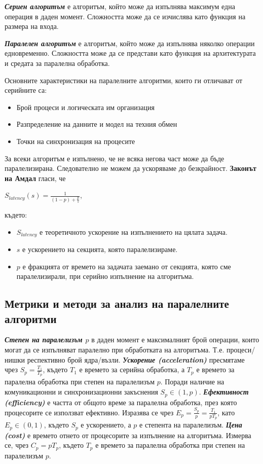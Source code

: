 \documentclass[fleqn,12pt]{article}
\begin{document}
\textbf{\textit{Сериен алгоритъм}} е алгоритъм, който може да изпълнява максимум една операция в даден момент.
Сложността може да се изчислява като функция на размера на входа.
\bigbreak

\textbf{\textit{Паралелен алгоритъм}} е алгоритъм, който може да изпълнява няколко операции едновременно.
Сложността може да се представи като функция на архитектурата и средата за паралелна обработка.

\bigbreak
Основните характеристики на паралелните алгоритми, които ги отличават от серийните са:
\begin{itemize}
    \item Брой процеси и логическата им организация
    \item Разпределение на данните и модел на техния обмен
    \item Точки на синхронизация на процесите
\end{itemize}
\bigbreak

За всеки алгоритъм е изпълнено, че не всяка негова част може да бъде паралелизирана.
Следователно не можем да ускоряваме до безкрайност.
\textbf{Законът на Амдал} гласи, че 
\begin{center}$S_{latency}(s) = \frac{1}{(1-p) + \frac{p}{s}}$, \end{center}
където:
\begin{itemize}
    \item $S_{latency}$ е теоретичното ускорение на изпълнението на цялата задача.
    \item $s$ е ускорението на секцията, която паралелизираме.
    \item $p$ е фракцията от времето на задачата заемано от секцията, която сме паралелизирали, при серийно изпълнение на алгоритъма.
\end{itemize}

\subsection{Метрики и методи за анализ на паралелните алгоритми}

\textbf{\textit{Степен на паралелизъм $p$}} в даден момент е максималният брой операции, които могат да се изпълняват паралелно при обработката на алгоритъма.
Т.е. процеси/нишки респективно брой ядра/възли.
\bigbreak
\textbf{\textit{Ускорение (acceleration)}} пресмятаме чрез $S_p = \frac{T_1}{T_p}$, където $T_1$ е времето за серийна обработка, а $T_p$ е времето за паралелна обработка при степен на паралелизъм $p$.
Поради наличие на комуникационни и синхронизационни закъснения $S_p \in (1, p)$.
\bigbreak
\textbf{\textit{Ефективност (efficiency)}} е частта от общото време за паралелна обработка, през която процесорите се използват ефективно.
Изразява се чрез $E_p = \frac{S_p}{p} = \frac{T_1}{pT_p}$, като $E_p \in (0, 1)$, където $S_p$ е ускорението, а $p$ е степента на паралелизъм.
\bigbreak
\textbf{\textit{Цена (cost)}} е времето отнето от процесорите за изпълнение на алгоритъма. Измерва се, чрез $C_p = pT_p$, където $T_p$ е времето за паралелна обработка при степен на паралелизъм $p$.
\bigbreak
\end{document}

